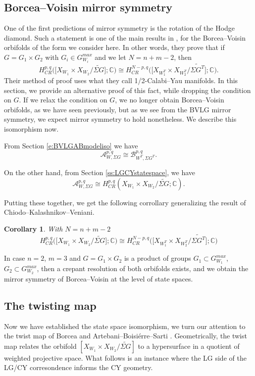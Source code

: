 \documentclass[10pt, letterpaper]{amsart}
\newtheorem{cor}[thm]{Corollary}
\theoremstyle{remark}
\newcommand{\CC}{\mathbb C}
\newcommand{\sA}{\mathscr{A}}
\newcommand{\sB}{\mathscr{B}}
\newcommand{\s}[1]{\Sigma #1}
\begin{document}
\subsection{Borcea--Voisin mirror symmetry}
One of the first predictions of mirror symmetry is the rotation of the Hodge diamond. Such a statement is one of the main results in \cite{CKV}, for the Borcea--Voisin orbifolds of the form we consider here. In other words, they prove that if $G=G_1\times G_2$ with $G_i\in G_{W_i}^{max}$ and we let $N=n+m-2$, then 
\[
H^{p,q}_{CR}\big(\big[X_{W_1}\times X_{W_2}/\widetilde{\s{G}}\big];\CC\big)\cong H^{N-p,q}_{CR}\big(\big[X_{W_1^T}\times X_{W_2^T}/\widetilde{\s{G^T}}\big];\CC\big).
\]
Their method of proof uses what they call 1/2-Calabi--Yau manifolds. In this section, we provide an alternative proof of this fact, while dropping the condition on $G$. 
If we relax the condition on $G$, we no longer obtain Borcea--Voisin orbifolds, as we have seen previously, but as we see from the BVLG mirror symmetry, we expect mirror symmetry to hold nonetheless. We describe this isomorphism now. 

From Section \ref{e:BVLGABmodeliso} we have 
\[
\sA_{W,\s{G}}^{p,q}\cong \sB_{W^T,\s{G^T}}^{p,q}.
\]

On the other hand, from Section \ref{ss:LGCYstatespace}, we have 
\[
\sA_{W,\s{G}}^{p,q}\cong H^{p,q}_{CR}(X_{W_1}\times X_{W_2}/\widetilde{\s{G}};\CC). 
\]

Putting these together, we get the following corrollary generalizing the result of Chiodo--Kalashnikov--Veniani.
\begin{cor}With $N=n+m-2$
	\[
	H^{p,q}_{CR}\big(\big[X_{W_1}\times X_{W_2}/\widetilde{\s{G}}\big];\CC\big)\cong H^{N-p,q}_{CR}\big(\big[X_{W_1^T}\times X_{W_2^T}/\widetilde{\s{G^T}}\big];\CC\big)
	\]
\end{cor}

In case $n=2$, $m=3$ and $G=G_1\times G_2$ is a product of groups $G_1\subset G_{W_1}^{max}$, $G_2\subset G_{W_2}^{max}$, then a crepant resolution of both orbifolds exists, and we obtain the mirror symmetry of Borcea--Voisin at the level of state spaces. 


\subsection{The twisting map}\label{ss:twistmap}
Now we have established the state space isomorphism, we turn our attention to the twist map of Borcea \cite{Borcea} and Artebani--Boisi\'erre--Sarti \cite{ABS}. Geometrically, the twist map relates the orbifold $[X_{W_1}\times X_{W_2}/\widetilde{\s{G}}]$ to a hypersurface in a quotient of weighted projective space. What follows is an instance where the LG side of the LG/CY corresondence informs the CY geometry. 
\end{document}
